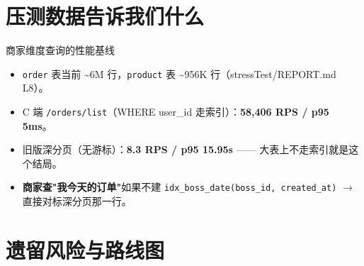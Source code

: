 \section{压测数据告诉我们什么}

\begin{frame}{商家维度查询的性能基线}
\begin{itemize}
  \item \texttt{order} 表当前 \textasciitilde 6M 行，\texttt{product} 表 \textasciitilde 956K 行（stressTest/REPORT.md L8）。
  \item C 端 \texttt{/orders/list}（WHERE user\_id 走索引）：\textbf{58{,}406 RPS / p95 5ms}。
  \item 旧版深分页（无游标）：\textbf{8.3 RPS / p95 15.95s} —— 大表上不走索引就是这个结局。
  \item \textbf{商家查"我今天的订单"}如果不建 \texttt{idx\_boss\_date(boss\_id, created\_at)} $\to$ 直接对标深分页那一行。
\end{itemize}
\end{frame}

\section{遗留风险与路线图}

